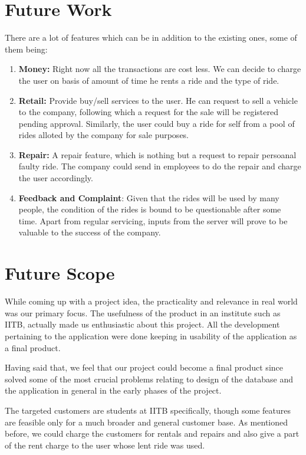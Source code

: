 \documentclass[paper=a4, fontsize=11pt]{scrartcl}
\numberwithin{equation}{section}		%
\numberwithin{figure}{section}			%
\numberwithin{table}{section}			%
\begin{document}
\section{Future Work}
There are a lot of features which can be in addition to the existing ones, some of them being:
\begin{enumerate}
	\item \textbf{Money:} Right now all the transactions are cost less. We can decide to charge the user on basis of amount of time he rents a ride and the type of ride. 
	\item \textbf{Retail:} Provide buy/sell services to the user. He can request to sell a vehicle to the company, following which a request for the sale will be registered pending approval. Similarly, the user could buy a ride for self from a pool of rides alloted by the company for sale purposes.
	\item \textbf{Repair:} A repair feature, which is nothing but a request to repair persoanal faulty ride. The company could send in employees to do the repair and charge the user accordingly.
	\item \textbf{Feedback and Complaint}: Given that the rides will be used by many people, the condition of the rides is bound to be questionable after some time. Apart from regular servicing, inputs from the server will prove to be valuable to the success of the company.
\end{enumerate}

\section{Future Scope}

While coming up with a project idea, the practicality and relevance in real world was our primary focus. The usefulness of the product in an institute such as IITB, actually made us enthusiastic about this project. All the development pertaining to the application were done keeping in usability of the application as a final product. 

Having said that, we feel that our project could become a final product since solved some of the most crucial problems relating to design of the database and the application in general in the early phases of the project. 

The targeted customers are students at IITB specifically, though some features are feasible only for a much broader and general customer base. As mentioned before, we could charge the customers for rentals and repairs and also give a part of the rent charge to the user whose lent ride was used.
\end{document}
